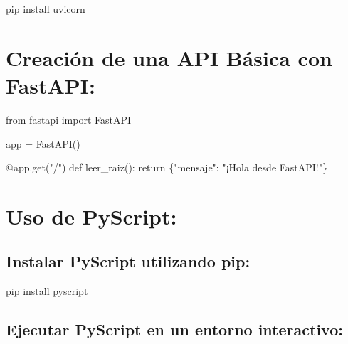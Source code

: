 \documentclass[
  a4paper,
  DIV=11,
  numbers=noendperiod,
  onepage,
  openany]{scrreprt}
\newenvironment{Shaded}{\begin{snugshade}}{\end{snugshade}}
\newcommand{\AttributeTok}[1]{\textcolor[rgb]{0.40,0.45,0.13}{#1}}
\newcommand{\ControlFlowTok}[1]{\textcolor[rgb]{0.00,0.23,0.31}{#1}}
\newcommand{\ExtensionTok}[1]{\textcolor[rgb]{0.00,0.23,0.31}{#1}}
\newcommand{\ImportTok}[1]{\textcolor[rgb]{0.00,0.46,0.62}{#1}}
\newcommand{\KeywordTok}[1]{\textcolor[rgb]{0.00,0.23,0.31}{#1}}
\newcommand{\NormalTok}[1]{\textcolor[rgb]{0.00,0.23,0.31}{#1}}
\newcommand{\OperatorTok}[1]{\textcolor[rgb]{0.37,0.37,0.37}{#1}}
\newcommand{\StringTok}[1]{\textcolor[rgb]{0.13,0.47,0.30}{#1}}
\begin{document}
\begin{Shaded}
\begin{Highlighting}[]
\ExtensionTok{pip}\NormalTok{ install uvicorn}
\end{Highlighting}
\end{Shaded}

\hypertarget{creaciuxf3n-de-una-api-buxe1sica-con-fastapi-1}{%
\section{Creación de una API Básica con
FastAPI:}\label{creaciuxf3n-de-una-api-buxe1sica-con-fastapi-1}}

\begin{Shaded}
\begin{Highlighting}[]
\ImportTok{from}\NormalTok{ fastapi }\ImportTok{import}\NormalTok{ FastAPI}

\NormalTok{app }\OperatorTok{=}\NormalTok{ FastAPI()}

\AttributeTok{@app.get}\NormalTok{(}\StringTok{"/"}\NormalTok{)}
\KeywordTok{def}\NormalTok{ leer\_raiz():}
    \ControlFlowTok{return}\NormalTok{ \{}\StringTok{"mensaje"}\NormalTok{: }\StringTok{"¡Hola desde FastAPI!"}\NormalTok{\}}
\end{Highlighting}
\end{Shaded}

\hypertarget{uso-de-pyscript-1}{%
\section{Uso de PyScript:}\label{uso-de-pyscript-1}}

\hypertarget{instalar-pyscript-utilizando-pip-1}{%
\subsection{Instalar PyScript utilizando
pip:}\label{instalar-pyscript-utilizando-pip-1}}

\begin{Shaded}
\begin{Highlighting}[]
\ExtensionTok{pip}\NormalTok{ install pyscript}
\end{Highlighting}
\end{Shaded}

\hypertarget{ejecutar-pyscript-en-un-entorno-interactivo-1}{%
\subsection{Ejecutar PyScript en un entorno
interactivo:}\label{ejecutar-pyscript-en-un-entorno-interactivo-1}}
\end{document}
